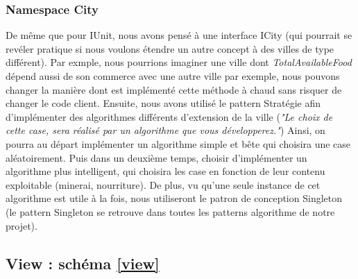 		\subsubsection{Namespace City}
			De même que pour IUnit, nous avons pensé à une interface ICity (qui pourrait se revéler pratique si nous voulons étendre un autre concept à des villes de type différent).
		Par exmple, nous pourrions imaginer une ville dont \textit{TotalAvailableFood} dépend aussi de son commerce avec une autre ville par exemple, nous pouvons changer la manière dont est implémenté cette méthode à chaud sans risquer de changer le code client.
			Ensuite, nous avons utilisé le pattern Stratégie afin d'implémenter des algorithmes différents d'extension de la ville (\textit{"Le choix de cette case, sera réalisé par un algorithme que vous développerez."})
		Ainsi, on pourra au départ implémenter un algorithme simple et bête qui choisira une case aléatoirement.
			Puis dans un deuxième temps, choisir d'implémenter un algorithme plus intelligent, qui choisira les case en fonction de leur contenu exploitable (minerai, nourriture).
		De plus, vu qu'une seule instance de cet algorithme est utile à la fois, nous utiliseront le patron de conception Singleton (le pattern Singleton se retrouve dans toutes les patterns algorithme de notre projet).
			
	
	\subsection{View : schéma \ref{view}}
